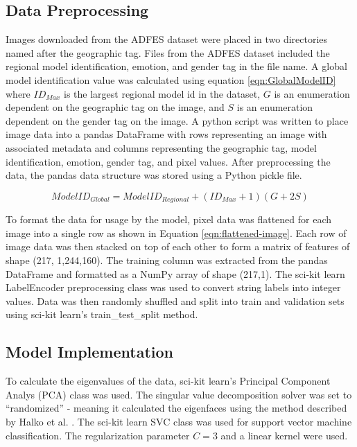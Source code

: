 \documentclass[journal]{new-aiaa}
\begin{document}
\subsection{Data Preprocessing}\label{sec:Implementation:Data Preprocessing}
Images downloaded from the ADFES dataset were placed in two directories named after the geographic tag.
Files from the ADFES dataset included the regional model identification, emotion, and gender tag in the file name.
A global model identification value was calculated using equation \ref{eqn:GlobalModelID} where $ID_{Max}$ is the largest regional model id in the dataset, $G$ is an enumeration dependent on the geographic tag on the image, and $S$ is an enumeration dependent on the gender tag on the image.
A python script was written to place image data into a pandas \cite{pandas} DataFrame with rows representing an image with associated metadata and columns representing the geographic tag, model identification, emotion, gender tag, and pixel values.
After preprocessing the data, the pandas data structure was stored using a Python pickle file.

\begin{equation}\label{eqn:GlobalModelID}
  ModelID_{Global}= ModelID_{Regional} + (ID_{Max}+1)(G + 2 S)
\end{equation}

To format the data for usage by the model, pixel data was flattened for each image into a single row as shown in Equation \ref{eqn:flattened-image}.
Each row of image data was then stacked on top of each other to form a matrix of features of shape (217, 1,244,160).
The training column was extracted from the pandas DataFrame and formatted as a NumPy array of shape (217,1).
The sci-kit learn \cite{scikit-learn} LabelEncoder preprocessing class was used to convert string labels into integer values.
Data was then randomly shuffled and split into train and validation sets using sci-kit learn's train\_test\_split method.

\subsection{Model Implementation}\label{sec:Implementation:Model Implementation}
To calculate the eigenvalues of the data, sci-kit learn's Principal Component Analys (PCA) class was used.
The singular value decomposition solver was set to ``randomized'' - meaning it calculated the eigenfaces using the method described by Halko et al. \cite{halko2011finding}.
The sci-kit learn SVC class was used for support vector machine classification.
The regularization parameter $C=3$ and a linear kernel were used.
\end{document}
